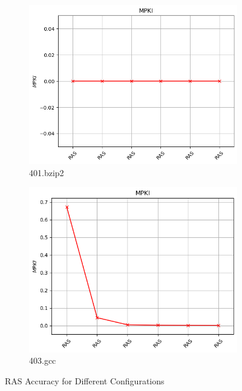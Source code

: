 \documentclass{article}
\begin{document}
\begin{figure}[H]
    \centering

    \begin{subfigure}[b]{0.45\textwidth}
        \includegraphics[width=\textwidth]{figures/5_5/401.bzip2.cslab_branch_preds_ref.out.png}
        \caption{401.bzip2}
        \label{fig:plot65}
    \end{subfigure}
    \hfill
    \begin{subfigure}[b]{0.45\textwidth}
        \includegraphics[width=\textwidth]{figures/5_5/403.gcc.cslab_branch_preds_ref.out.png}
        \caption{403.gcc}
        \label{fig:plot66}
    \end{subfigure}

    \vspace{0.5cm} %

    \caption{RAS Accuracy for Different Configurations}
    \label{fig:ras}
\end{figure}
\end{document}
